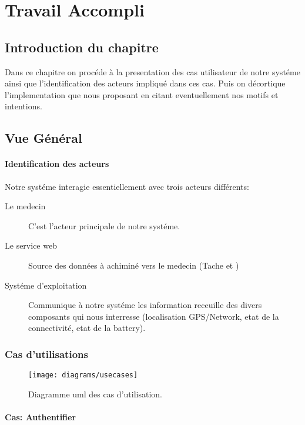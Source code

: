 
\chapter{Travail Accompli}
\section{Introduction du chapitre}
Dans ce chapitre on procéde à la presentation des cas utilisateur de notre systéme ainsi que l'identification des acteurs impliqué dans ces cas. Puis on décortique l'implementation que nous proposant en citant eventuellement nos motifs et intentions.

\section{Vue Général}
\subsubsection{Identification des acteurs}
Notre systéme interagie essentiellement avec trois acteurs différents:
\begin{description}
\item[Le medecin] C'est l'acteur principale de notre systéme.

\item[Le service web] Source des données à achiminé vers le medecin
(Tache et )

\item[Systéme d'exploitation] Communique à notre systéme les information
receuille des divers composants qui nous interresse (localisation
GPS/Network, etat de la connectivité, etat de la battery).

\end{description}

\subsection{Cas d'utilisations}

\begin{figure}
\center
\texttt{[image: diagrams/usecases]}
\caption{Diagramme \gls{uml} des cas d'utilisation.}
\label{fig:usecase}
\end{figure}

\subsubsection{Cas: Authentifier}
